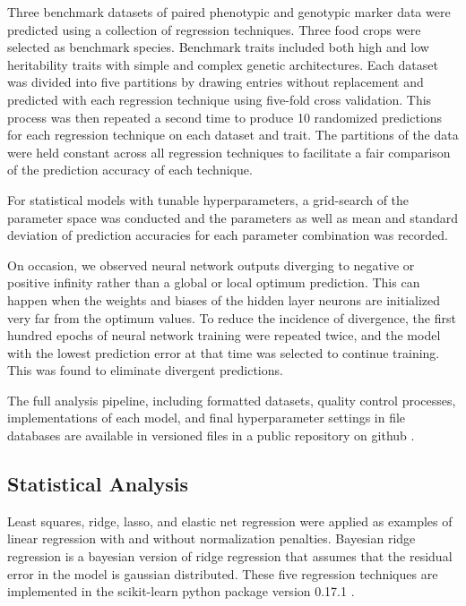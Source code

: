 Three benchmark datasets of paired phenotypic and genotypic marker data were predicted 
using a collection of regression techniques. Three food crops were selected
as benchmark species. Benchmark traits included both high and low heritability 
traits with simple and complex genetic architectures. Each dataset was divided
into five partitions by drawing entries without replacement and predicted with each
regression technique using five-fold cross validation. This process was then repeated
a second time to produce 10 randomized predictions for each regression technique on
each dataset and trait. The partitions of the data were held constant across all 
regression techniques to facilitate a fair comparison of the prediction accuracy of 
each technique.

For statistical models with tunable hyperparameters, a grid-search of the parameter 
space was conducted and the parameters as well as mean and standard deviation of
prediction accuracies for each parameter combination was recorded. 

On occasion, we observed neural network outputs diverging to negative or positive infinity rather
than a global or local optimum prediction. This can happen when the weights and biases of the 
hidden layer neurons are initialized very far from the optimum values. To reduce
the incidence of divergence, the first hundred epochs of neural network training
were repeated twice, and the model with the lowest prediction error at that time was selected
to continue training. This was found to eliminate divergent predictions.

The full analysis pipeline, including formatted datasets, quality control processes, 
implementations of each model, and final hyperparameter settings in file databases 
are available in versioned files in a public repository on github \citep{mcdowell2016}.

\subsection*{Statistical Analysis} 

Least squares, ridge, lasso, and elastic net regression were applied as examples of
linear regression with and without normalization penalties. Bayesian 
ridge regression is a bayesian version of ridge regression that assumes that 
the residual error in the model is gaussian distributed. These five regression 
techniques are implemented in the scikit-learn python package version 0.17.1 \citep{scikit-learn}.

